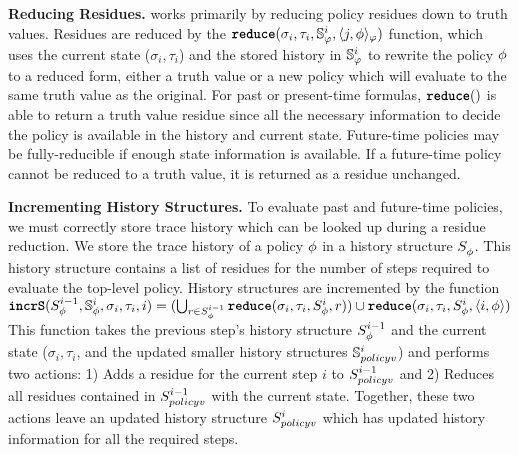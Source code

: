 \textbf{Reducing Residues.}
\monitor works primarily by reducing policy residues down to truth values. Residues are reduced by the $\reduce(\sigma_i, \tau_i, \histSt{i}, \rpt{j}{\policyv}{\policy})$ function, which uses the current state ($\sigma_i,\tau_i$) and the stored history in $\histSt{i}$ to rewrite the policy $\policyv$ to a reduced form, either a truth value or a new policy which will evaluate to the same truth value as the original. For past or present-time formulas, $\reduce()$ is able to return a truth value residue since all the necessary information to decide the policy is available in the history and current state. Future-time policies may be fully-reducible if enough state information is available. If a future-time policy cannot be reduced to a truth value, it is returned as a residue unchanged.

\textbf{Incrementing History Structures.}
To evaluate past and future-time policies, we must correctly store trace history which can be looked up during a residue reduction. 
We store the trace history of a policy $\policyv$ in a history structure $\histst[\policyv]{}$. 
This history structure contains a list of residues for the number of steps required to evaluate the top-level policy. History structures are incremented by the function 
$\incrS(\histst[\policyv]{i-1}, \histSt[\policyv]{i}, \sigma_i, \tau_i, i) = (\bigcup_{r \in \histst[\policyv]{i-1}} \reduce(\sigma_i, \tau_i, \histst[\policyv]{i}, r)) \cup \reduce(\sigma_i, \tau_i, \histst[\policyv]{i}, \rp{i}{\policyv})$
%
This function takes the previous step's history structure $\histst[\policyv]{i-1}$ and the current state ($\sigma_i,\tau_i$, and the updated smaller history structures $\histSt[policyv]{i}$) and performs two actions:
	1) Adds a residue for the current step $i$ to $\histst[policyv]{i-1}$ and
	2) Reduces all residues contained in $\histst[policyv]{i-1}$ with the current state.
Together, these two actions leave an updated history structure $\histst[policyv]{i}$ which has updated history information for all the required steps.

